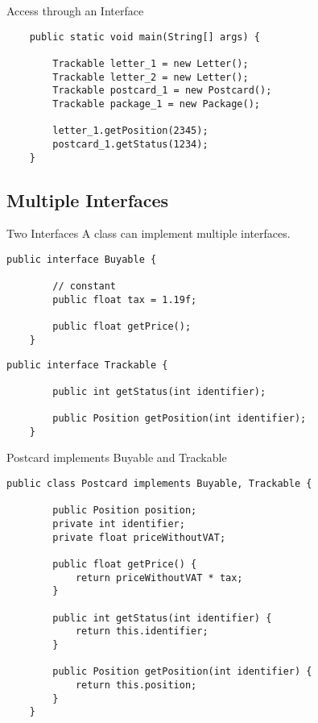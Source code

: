 \begin{frame}[fragile]{Access through an Interface}
	\begin{lstlisting}
	public static void main(String[] args) {
	
	    Trackable letter_1 = new Letter();
	    Trackable letter_2 = new Letter();
	    Trackable postcard_1 = new Postcard();
	    Trackable package_1 = new Package();
	    
	    letter_1.getPosition(2345);
	    postcard_1.getStatus(1234);
	}
	\end{lstlisting}
\end{frame}

\subsection{Multiple Interfaces}
\begin{frame}[fragile]{Two Interfaces}
	A class can implement multiple interfaces.
	\vfill
	\begin{lstlisting}[basicstyle=\ttfamily\scriptsize]
	public interface Buyable {
	
	    // constant
	    public float tax = 1.19f;
	
	    public float getPrice();
	}
	\end{lstlisting}
	\begin{lstlisting}[basicstyle=\ttfamily\scriptsize]
	public interface Trackable {
	
	    public int getStatus(int identifier);
	    
	    public Position getPosition(int identifier);
	}
	\end{lstlisting}
\end{frame}

\begin{frame}[fragile]{Postcard implements Buyable and Trackable}
	\begin{lstlisting}[basicstyle=\ttfamily\scriptsize]
	public class Postcard implements Buyable, Trackable {
	
	    public Position position;
	    private int identifier;
	    private float priceWithoutVAT;
	    
	    public float getPrice() {
	        return priceWithoutVAT * tax;
	    }
	
	    public int getStatus(int identifier) {
	        return this.identifier;
	    }
	    
	    public Position getPosition(int identifier) {
	        return this.position;
	    }
	}
	\end{lstlisting}
\end{frame}

